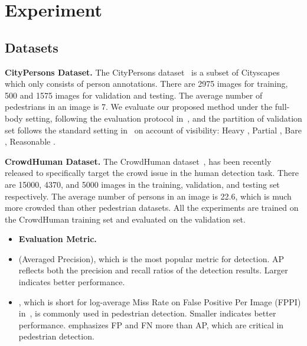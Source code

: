 \documentclass{article}
\begin{document}
\section{Experiment}

\subsection{Datasets}
\textbf{CityPersons Dataset.}
The CityPersons dataset~\cite{citypersons} is a subset of Cityscapes which only consists of person annotations.
There are 2975 images for training, 500 and 1575 images for validation and testing. 
The average number of pedestrians in an image is 7. 
We evaluate our proposed method under the full-body setting, following the evaluation protocol in~\cite{citypersons}, and the partition of validation set follows the standard setting in~\cite{RepLoss} on account of visibility: Heavy , Partial , Bare , Reasonable . 

\textbf{CrowdHuman Dataset.} 
The CrowdHuman dataset~\cite{crowdhuman}, has been recently released to specifically target the crowd issue in the human detection task.
There are 15000, 4370, and 5000 images in the training, validation, and testing set respectively. 
The average number of persons in an image is 22.6, which is much more crowded than other pedestrian datasets. 
All the experiments are trained on the CrowdHuman training set and evaluated on the validation set.


\begin{itemize}[leftmargin=0pt]
    \setlength{\itemsep}{0pt}
    \setlength{\parsep}{0pt}
    \setlength{\parskip}{0pt}
    \item[]{\textbf{Evaluation Metric.}}
    \item[] \bm{} (Averaged Precision), which is the most popular metric for detection. AP reflects both the precision and recall ratios of the detection results. 
    Larger  indicates better performance.
    \item[] \bm{}, which is short for log-average Miss Rate on False Positive Per Image (FPPI) in~\cite{metric}, is commonly used in pedestrian detection.
Smaller  indicates better performance.
     emphasizes FP and FN more than AP, which are critical in pedestrian detection.
\end{itemize}
\end{document}
